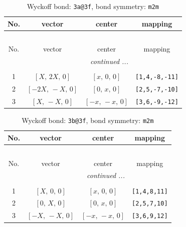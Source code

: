 \documentclass[fleqn,8pt]{jsarticle}
\begin{document}
\begin{longtable}{cccc}
\caption{Wyckoff bond: {\tt 3a@3f}, bond symmetry: {\tt m2m}}
 \\
 \hline \hline
No. & vector & center & mapping \\ \hline \endfirsthead

\multicolumn{3}{l}{\tablename\ \thetable{}} \\
 \hline \hline
No. & vector & center & mapping \\ \hline \endhead

 \hline \hline
\multicolumn{3}{r}{\footnotesize\it continued ...} \\ \endfoot

 \hline \hline
\multicolumn{3}{r}{} \\ \endlastfoot

1 & $\left[ X,\, 2 X,\, 0 \right]$ & $\left[ x,\, 0,\, 0 \right]$ & {\tt [1,4,-8,-11]} \\ \hline
2 & $\left[ - 2 X,\, - X,\, 0 \right]$ & $\left[ 0,\, x,\, 0 \right]$ & {\tt [2,5,-7,-10]} \\ \hline
3 & $\left[ X,\, - X,\, 0 \right]$ & $\left[ - x,\, - x,\, 0 \right]$ & {\tt [3,6,-9,-12]} \\
\end{longtable}
\renewcommand{\arraystretch}{1.2}
\begin{longtable}{cccc}
\caption{Wyckoff bond: {\tt 3b@3f}, bond symmetry: {\tt m2m}}
 \\
 \hline \hline
No. & vector & center & mapping \\ \hline \endfirsthead

\multicolumn{3}{l}{\tablename\ \thetable{}} \\
 \hline \hline
No. & vector & center & mapping \\ \hline \endhead

 \hline \hline
\multicolumn{3}{r}{\footnotesize\it continued ...} \\ \endfoot

 \hline \hline
\multicolumn{3}{r}{} \\ \endlastfoot

1 & $\left[ X,\, 0,\, 0 \right]$ & $\left[ x,\, 0,\, 0 \right]$ & {\tt [1,4,8,11]} \\ \hline
2 & $\left[ 0,\, X,\, 0 \right]$ & $\left[ 0,\, x,\, 0 \right]$ & {\tt [2,5,7,10]} \\ \hline
3 & $\left[ - X,\, - X,\, 0 \right]$ & $\left[ - x,\, - x,\, 0 \right]$ & {\tt [3,6,9,12]} \\
\end{longtable}
\end{document}
